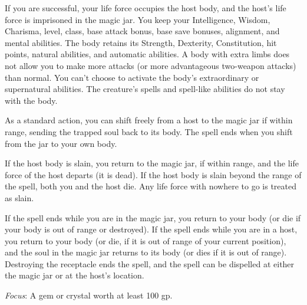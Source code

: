 {	If you are successful, your life force occupies the host body, and the host's life force is imprisoned in the magic jar. You keep your Intelligence, Wisdom, Charisma, level, class, base attack bonus, base save bonuses, alignment, and mental abilities. The body retains its Strength, Dexterity, Constitution, hit points, natural abilities, and automatic abilities. A body with extra limbs does not allow you to make more attacks (or more advantageous two-weapon attacks) than normal. You can't choose to activate the body's extraordinary or supernatural abilities. The creature's spells and spell-like abilities do not stay with the body.

	As a standard action, you can shift freely from a host to the magic jar if within range, sending the trapped soul back to its body. The spell ends when you shift from the jar to your own body.

	If the host body is slain, you return to the magic jar, if within range, and the life force of the host departs (it is dead). If the host body is slain beyond the range of the spell, both you and the host die. Any life force with nowhere to go is treated as slain.

	If the spell ends while you are in the magic jar, you return to your body (or die if your body is out of range or destroyed). If the spell ends while you are in a host, you return to your body (or die, if it is out of range of your current position), and the soul in the magic jar returns to its body (or dies if it is out of range). Destroying the receptacle ends the spell, and the spell can be dispelled at either the magic jar or at the host's location.

	\textit{Focus}:
	A gem or crystal worth at least 100 gp.

}
